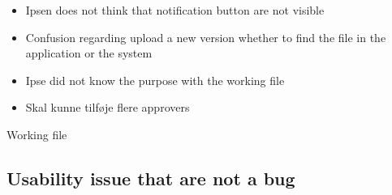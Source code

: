 \begin{itemize}
	\item Ipsen does not think that notification button are not visible
	\item Confusion regarding upload a new version whether to find the file in the application or the system 
	\item Ipse did not know the purpose with the working file 
	\item Skal kunne tilføje flere approvers 
\end{itemize}

Working file



\subsection{Usability issue that are not a bug}




